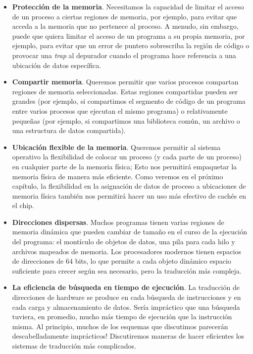 \documentclass[10pt]{book}
\begin{document}
\begin{itemize}
\item \textbf{Protección de la memoria}. Necesitamos la capacidad de limitar el acceso de un proceso a ciertas regiones de memoria, por ejemplo, para evitar que acceda a la memoria que no pertenece al proceso. A menudo, sin embargo, puede que quiera limitar el acceso de un programa a su propia memoria, por ejemplo, para evitar que un error de puntero sobrescriba la región de código o provocar una \textit{trap} al depurador cuando el programa hace referencia a una ubicación de datos específica.

\item \textbf{Compartir memoria}. Queremos permitir que varios procesos compartan regiones de memoria seleccionadas. Estas regiones compartidas pueden ser grandes (por ejemplo, si compartimos el segmento de código de un programa entre varios procesos que ejecutan el mismo programa) o relativamente pequeñas (por ejemplo, si compartimos una biblioteca común, un archivo o una estructura de datos compartida).

\item \textbf{Ubicación flexible de la memoria}. Queremos permitir al sistema operativo la flexibilidad de colocar un proceso (y cada parte de un proceso) en cualquier parte de la memoria física; Esto nos permitirá empaquetar la memoria física de manera más eficiente. Como veremos en el próximo capítulo, la flexibilidad en la asignación de datos de proceso a ubicaciones de memoria física también nos permitirá hacer un uso más efectivo de cachés en el chip.

\item \textbf{Direcciones dispersas}. Muchos programas tienen varias regiones de memoria dinámica que pueden cambiar de tamaño en el curso de la ejecución del programa: el montículo de objetos de datos, una pila para cada hilo y archivos mapeados de memoria. Los procesadores modernos tienen espacios de direcciones de $64$ bits, lo que permite a cada objeto dinámico espacio suficiente para crecer según sea necesario, pero la traducción más compleja.

\item \textbf{La eficiencia de búsqueda en tiempo de ejecución}. La traducción de direcciones de hardware se produce en cada búsqueda de instrucciones y en cada carga y almacenamiento de datos. Sería impráctico que una búsqueda tuviera, en promedio, mucho más tiempo de ejecución que la instrucción misma. Al principio, muchos de los esquemas que discutimos parecerán descabelladamente imprácticos! Discutiremos maneras de hacer eficientes los sistemas de traducción más complicados.


\end{itemize}
\end{document}
